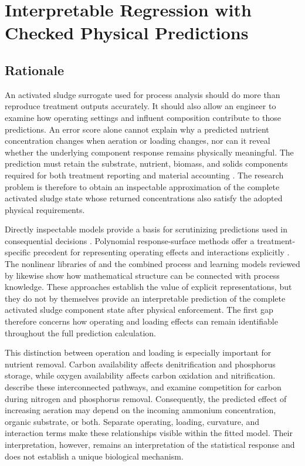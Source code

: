 \chapter{Interpretable Regression with Checked Physical Predictions}
\label{ch:interpretable}

\section{Rationale}

An activated sludge surrogate used for process analysis should do more than reproduce treatment outputs accurately. It should also allow an engineer to examine how operating settings and influent composition contribute to those predictions. An error score alone cannot explain why a predicted nutrient concentration changes when aeration or loading changes, nor can it reveal whether the underlying component response remains physically meaningful. The prediction must retain the substrate, nutrient, biomass, and solids components required for both treatment reporting and material accounting \citep{Henze2006}. The research problem is therefore to obtain an inspectable approximation of the complete activated sludge state whose returned concentrations also satisfy the adopted physical requirements.

Directly inspectable models provide a basis for scrutinizing predictions used in consequential decisions \citep{Rudin2019}. Polynomial response-surface methods offer a treatment-specific precedent for representing operating effects and interactions explicitly \citep{Nazlabadi2021}. The nonlinear libraries of \citet{Brunton2016} and the combined process and learning models reviewed by \citet{Shen2023} likewise show how mathematical structure can be connected with process knowledge. These approaches establish the value of explicit representations, but they do not by themselves provide an interpretable prediction of the complete activated sludge component state after physical enforcement. The first gap therefore concerns how operating and loading effects can remain identifiable throughout the full prediction calculation.

This distinction between operation and loading is especially important for nutrient removal. Carbon availability affects denitrification and phosphorus storage, while oxygen availability affects carbon oxidation and nitrification. \citet{Wentzel1992} describe these interconnected pathways, and \citet{Guerrero2011} examine competition for carbon during nitrogen and phosphorus removal. Consequently, the predicted effect of increasing aeration may depend on the incoming ammonium concentration, organic substrate, or both. Separate operating, loading, curvature, and interaction terms make these relationships visible within the fitted model. Their interpretation, however, remains an interpretation of the statistical response and does not establish a unique biological mechanism.

